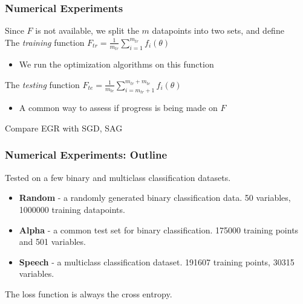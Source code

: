 \documentclass{beamer}
\begin{document}
\begin{frame}
	\frametitle{Numerical Experiments}
	Since $F$ is not available, we split the $m$ datapoints into two sets, and define\\
	
	\pause
	The \textit{training} function $F_{tr} = \frac{1}{m_{tr}} \sum_{i=1}^{m_{tr}}  f_i(\theta) $ 
	\begin{itemize}
		\item We run the optimization algorithms on this function
	\end{itemize}
	
	\pause
	The \textit{testing} function $F_{te} =\frac{1}{m_{te}} \sum_{i=m_{tr}+1}^{m_{tr}+m_{te}}  f_i(\theta) $
	\begin{itemize}
		\item A common way to assess if progress is being made on $F$ 
	\end{itemize}
	
	\pause
Compare EGR with SGD, SAG
	
\end{frame}

		\begin{frame}
			\frametitle{Numerical Experiments: Outline}
			Tested on a few binary and multiclass classification datasets. 
			\begin{itemize}
				\item \textbf{Random} - a randomly generated binary classification data. 50 variables, 1000000 training datapoints. 
				\item \textbf{Alpha}  - a common test set for binary classification. 175000 training points and 501 variables.
				\item \textbf{Speech} - a multiclass classification dataset. 191607 training points, 30315 variables. 
			\end{itemize}
			The loss function is always the cross entropy.
			
     	\end{frame}
		
\end{document}
